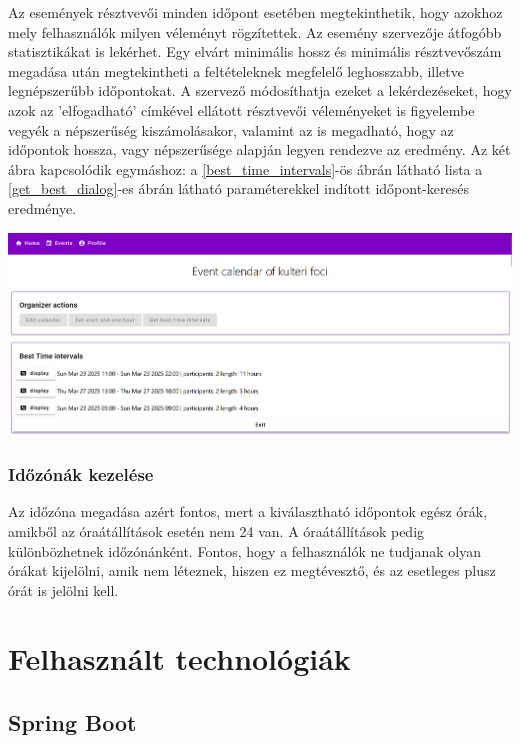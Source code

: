 \documentclass[a4paper,12pt]{report}
\theoremstyle{definition}
\theoremstyle{remark}
\begin{document}
Az események résztvevői minden időpont esetében megtekinthetik, hogy azokhoz mely felhasználók milyen véleményt rögzítettek. Az esemény szervezője átfogóbb statisztikákat is lekérhet. Egy elvárt minimális hossz és minimális résztvevőszám megadása után megtekintheti a feltételeknek megfelelő leghosszabb, illetve legnépszerűbb időpontokat. A szervező módosíthatja ezeket a lekérdezéseket, hogy azok az 'elfogadható' címkével ellátott résztvevői véleményeket is figyelembe vegyék a népszerűség kiszámolásakor, valamint az is megadható, hogy az időpontok hossza, vagy népszerűsége alapján legyen rendezve az eredmény. Az két ábra kapcsolódik egymáshoz: a \ref{best_time_intervals}-ös ábrán látható lista a \ref{get_best_dialog}-es ábrán látható paraméterekkel indított időpont-keresés eredménye.

\begin{center}
\includegraphics[width=150mm]{best_time_intervals}
\captionsetup{width=0.8\linewidth}
\label{best_time_intervals}
\end{center}

	\subsection{Időzónák kezelése}

Az időzóna megadása azért fontos, mert a  kiválasztható időpontok egész órák, amikből az óraátállítások esetén nem 24 van. A óraátállítások pedig különbözhetnek időzónánként. Fontos, hogy a felhasználók ne tudjanak olyan órákat kijelölni, amik nem léteznek, hiszen ez megtévesztő, és az esetleges plusz órát is jelölni kell.

\chapter{Felhasznált technológiák}

\section{Spring Boot}
\end{document}
